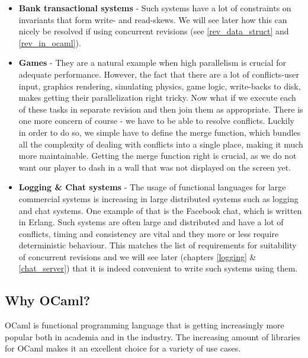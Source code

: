 \documentclass[12pt,twoside,notitlepage]{report}
\begin{document}
\begin{itemize}


\item
{\bfseries Bank transactional systems} - Such systems have a lot of constraints on invariants that form write- and read-skews. We will see later how this can nicely be resolved if using concurrent revisions (see \ref{rev_data_struct} and \ref{rev_in_ocaml}).

\item
{\bfseries Games} - They are a natural example when high parallelism is crucial for adequate performance. However, the fact that there are a lot of conflicts-user input, graphics rendering, simulating physics, game logic, write-backs to disk, makes getting their parallelization right tricky. Now what if we execute each of these tasks in separate revision and then join them as appropriate. There is one more concern of course - we have to be able to resolve conflicts. Luckily in order to do so, we simple have to define the merge function, which bundles all the complexity of dealing with conflicts into a single place, making it much more maintainable. Getting the merge function right is crucial, as we do not want our player to dash in a wall that was not displayed on the screen yet.

\item
{\bfseries Logging \& Chat systems} - The usage of functional languages for large commercial systems is increasing in large distributed systems such as logging and chat systems. One example of that is the Facebook chat, which is written in Erlang. Such systems are often large and distributed and have a lot of conflicts, timing and consistency are vital and they more or less require deterministic behaviour. This matches the list of requirements for suitability of concurrent revisions and we will see later (chapters \ref{logging} \& \ref{chat_server}) that it is indeed convenient to write such systems using them.

\end{itemize}

\subsection{Why OCaml?}

OCaml is functional programming language that is getting increasingly more popular both in academia and in the industry. The increasing amount of libraries for OCaml makes it an excellent choice for a variety of use cases. 
\end{document}
